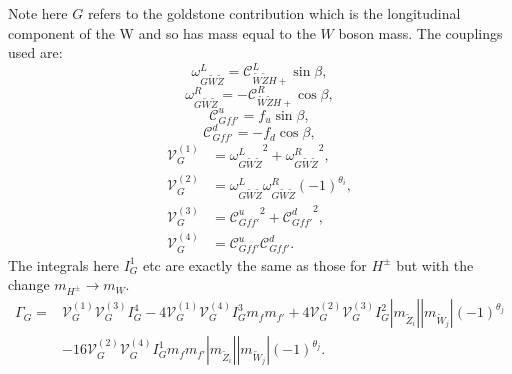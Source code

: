 \documentclass[final,3p,times]{elsarticle}
\begin{document}
Note here $G$ refers to the goldstone contribution which is the longitudinal component of the W and so has mass equal to the $W$ boson mass.
The couplings used are:
\begin{equation}
\omega_{G \tilde{W} \tilde{Z}}^L = \mathcal{C}_{\tilde{W} \tilde{Z} H+}^L \sin\beta,
\end{equation}
\begin{equation}
\omega_{G \tilde{W} \tilde{Z}}^R = -\mathcal{C}_{\tilde{W} \tilde{Z} H+}^R \cos\beta,
\end{equation}
\begin{equation}
\mathcal{C}_{G f f'}^u = f_{u}\sin\beta,
\end{equation}
\begin{equation}
\mathcal{C}_{G f f'}^d = -f_{d} \cos\beta,
\end{equation}
\begin{align}
\mathcal{V}_{G}^{(1)} &= {\omega_{G \tilde{W} \tilde{Z}}^L}^2 + {\omega_{G \tilde{W} \tilde{Z}}^R}^2, \\
\mathcal{V}_{G}^{(2)} &= \omega_{G \tilde{W} \tilde{Z}}^L  \omega_{G \tilde{W} \tilde{Z}}^R  (-1)^{\theta_i}, \\
\mathcal{V}_{G}^{(3)} &= {\mathcal{C}_{G f f'}^u}^2 + {\mathcal{C}_{G f f'}^d}^2, \\
\mathcal{V}_{G}^{(4)} &= {\mathcal{C}_{G f f'}^u}  \mathcal{C}_{G f f'}^d.
\end{align}
The integrals here $I_{G}^{1}$ etc are exactly the same as those for $H^{\pm}$ but with the change $m_{H^{\pm}} \rightarrow m_{W}$.
\begin{equation}
\begin{aligned}
\Gamma_{G} = & \mathcal{V}_{G}^{(1)} \mathcal{V}_{G}^{(3)} I_{G}^{4} - 4 \mathcal{V}_{G}^{(1)} \mathcal{V}_{G}^{(4)} I_{G}^3 m_{f} m_{f'} + 4 \mathcal{V}_{G}^{(2)} \mathcal{V}_{G}^{(3)} I_{G}^2 |m_{\tilde{Z}_i}||m_{\tilde{W}_j}|(-1)^{\theta_j} \\ & - 16 \mathcal{V}_{G}^{(2)} \mathcal{V}_{G}^{(4)} I_{G}^{1} m_{f} m_{f'} |m_{\tilde{Z}_i}||m_{\tilde{W}_j}|(-1)^{\theta_j}.
\end{aligned}
\end{equation}
\end{document}
